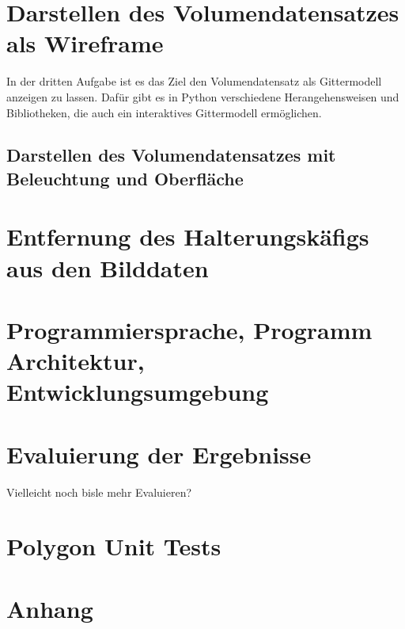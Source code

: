 \documentclass[conference]{IEEEtran}
\begin{document}
\section{Darstellen des Volumendatensatzes als Wireframe}
In der dritten Aufgabe ist es das Ziel den Volumendatensatz als Gittermodell anzeigen zu lassen. Dafür gibt es in Python verschiedene Herangehensweisen und Bibliotheken, die auch ein interaktives Gittermodell ermöglichen.

\subsection{Darstellen des Volumendatensatzes mit Beleuchtung und Oberfläche}

\section{Entfernung des Halterungskäfigs aus den Bilddaten}

\section{Programmiersprache, Programm Architektur, Entwicklungsumgebung}
 
\section{Evaluierung der Ergebnisse}
	
	Vielleicht noch bisle mehr Evaluieren?


\section{Polygon Unit Tests}


\section{Anhang}



\end{document}
